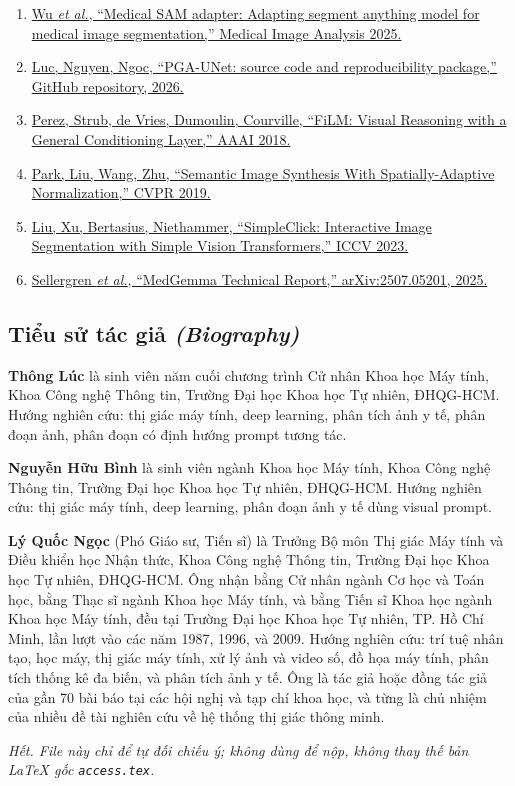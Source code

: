 \documentclass[11pt]{article}
\newcommand{\enlabel}[1]{{\small\itshape\color{gray} (#1)}}
\begin{document}
\begin{enumerate}[leftmargin=1.6em]
\item \href{https://doi.org/10.1016/j.media.2025.103547}{Wu \textit{et al.}, ``Medical SAM adapter: Adapting segment anything model for medical image segmentation,'' Medical Image Analysis 2025.}
\item \href{https://github.com/ThongLuc2k3/PGA_Unet2D}{Luc, Nguyen, Ngoc, ``PGA-UNet: source code and reproducibility package,'' GitHub repository, 2026.}
\item \href{https://arxiv.org/abs/1709.07871}{Perez, Strub, de Vries, Dumoulin, Courville, ``FiLM: Visual Reasoning with a General Conditioning Layer,'' AAAI 2018.}
\item \href{https://openaccess.thecvf.com/content_CVPR_2019/html/Park_Semantic_Image_Synthesis_With_Spatially-Adaptive_Normalization_CVPR_2019_paper.html}{Park, Liu, Wang, Zhu, ``Semantic Image Synthesis With Spatially-Adaptive Normalization,'' CVPR 2019.}
\item \href{https://openaccess.thecvf.com/content/ICCV2023/html/Liu_SimpleClick_Interactive_Image_Segmentation_with_Simple_Vision_Transformers_ICCV_2023_paper.html}{Liu, Xu, Bertasius, Niethammer, ``SimpleClick: Interactive Image Segmentation with Simple Vision Transformers,'' ICCV 2023.}
\item \href{https://arxiv.org/abs/2507.05201}{Sellergren \textit{et al.}, ``MedGemma Technical Report,'' arXiv:2507.05201, 2025.}
\end{enumerate}

\subsection*{Tiểu sử tác giả \enlabel{Biography}}
\textbf{Thông Lúc} là sinh viên năm cuối chương trình Cử nhân Khoa học Máy tính, Khoa Công nghệ Thông tin, Trường Đại học Khoa học Tự nhiên, ĐHQG-HCM. Hướng nghiên cứu: thị giác máy tính, deep learning, phân tích ảnh y tế, phân đoạn ảnh, phân đoạn có định hướng prompt tương tác.

\textbf{Nguyễn Hữu Bình} là sinh viên ngành Khoa học Máy tính, Khoa Công nghệ Thông tin, Trường Đại học Khoa học Tự nhiên, ĐHQG-HCM. Hướng nghiên cứu: thị giác máy tính, deep learning, phân đoạn ảnh y tế dùng visual prompt.

\textbf{Lý Quốc Ngọc} (Phó Giáo sư, Tiến sĩ) là Trưởng Bộ môn Thị giác Máy tính và Điều khiển học Nhận thức, Khoa Công nghệ Thông tin, Trường Đại học Khoa học Tự nhiên, ĐHQG-HCM. Ông nhận bằng Cử nhân ngành Cơ học và Toán học, bằng Thạc sĩ ngành Khoa học Máy tính, và bằng Tiến sĩ Khoa học ngành Khoa học Máy tính, đều tại Trường Đại học Khoa học Tự nhiên, TP. Hồ Chí Minh, lần lượt vào các năm 1987, 1996, và 2009. Hướng nghiên cứu: trí tuệ nhân tạo, học máy, thị giác máy tính, xử lý ảnh và video số, đồ họa máy tính, phân tích thống kê đa biến, và phân tích ảnh y tế. Ông là tác giả hoặc đồng tác giả của gần 70 bài báo tại các hội nghị và tạp chí khoa học, và từng là chủ nhiệm của nhiều đề tài nghiên cứu về hệ thống thị giác thông minh.

\bigskip
{\small\color{gray}\textit{Hết. File này chỉ để tự đối chiếu ý; không dùng để nộp, không thay thế bản LaTeX gốc \texttt{access.tex}.}}
\end{document}
